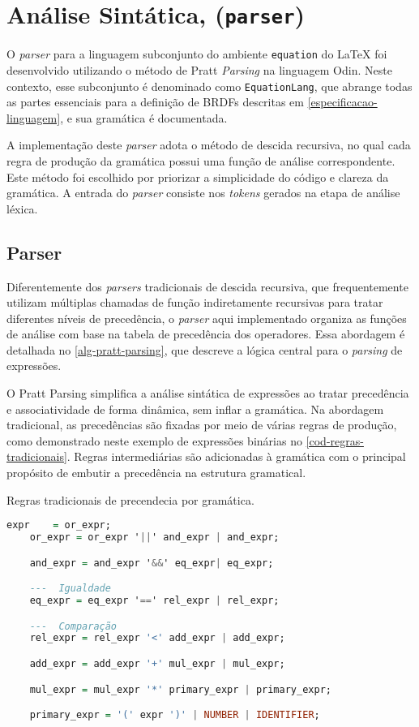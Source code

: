 
\section{Análise Sintática, (\texttt{parser})} \label{section-parser}

O \textit{parser} para a linguagem subconjunto do ambiente \verb|equation| do \LaTeX{} foi desenvolvido utilizando o método de Pratt \textit{Parsing} na linguagem Odin. Neste contexto, esse subconjunto é denominado como \texttt{EquationLang}, que abrange todas as partes essenciais para a definição de BRDFs descritas em \autoref{especificacao-linguagem}, e sua gramática é documentada.

A implementação deste \textit{parser} adota o método de descida recursiva, no qual cada regra de produção da gramática possui uma função de análise correspondente. Este método foi escolhido por priorizar a  simplicidade do código e clareza da gramática. A entrada do \textit{parser} consiste nos \textit{tokens} gerados na etapa de análise léxica.


\subsection{Parser}
Diferentemente dos \textit{parsers} tradicionais de descida recursiva, que frequentemente utilizam múltiplas chamadas de função indiretamente recursivas para tratar diferentes níveis de precedência, o \textit{parser} aqui implementado organiza as funções de análise com base na tabela de precedência dos operadores. Essa abordagem é detalhada no \autoref{alg-pratt-parsing}, que descreve a lógica central para o \textit{parsing} de expressões.

O Pratt Parsing simplifica a análise sintática de expressões ao tratar precedência e associatividade de forma dinâmica, sem inflar a gramática. Na abordagem tradicional, as precedências são fixadas por meio de várias regras de produção, como demonstrado neste exemplo de expressões binárias no \autoref{cod-regras-tradicionais}. Regras intermediárias são adicionadas à gramática com o principal propósito de embutir a precedência na estrutura gramatical.

\begin{codigo}[htb]
    \caption{\small Regras tradicionais de precendecia por gramática. }
    \label{cod-regras-tradicionais}
\begin{lstlisting}[language=haskell, numbers=none, inputencoding=utf8]
    expr    = or_expr;
    or_expr = or_expr '||' and_expr | and_expr;

    and_expr = and_expr '&&' eq_expr| eq_expr;

    ---  Igualdade
    eq_expr = eq_expr '==' rel_expr | rel_expr;   

    ---  Comparação
    rel_expr = rel_expr '<' add_expr | add_expr;     

    add_expr = add_expr '+' mul_expr | mul_expr;

    mul_expr = mul_expr '*' primary_expr | primary_expr;

    primary_expr = '(' expr ')' | NUMBER | IDENTIFIER; 
\end{lstlisting}
\end{codigo}

